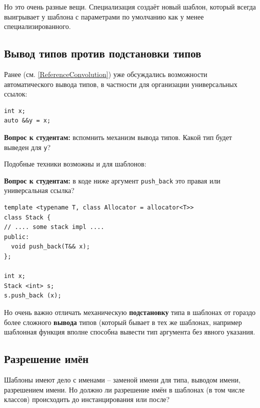 \documentclass[a4paper,12pt,oneside]{book}
\newif\ifanswers
\begin{document}
Но это очень разные вещи. Специализация создаёт новый шаблон, который всегда выигрывает у шаблона с параметрами по умолчанию как у менее специализированного.

\subsection{Вывод типов против подстановки типов}

Ранее (см. \ref{ReferenceConvolution}) уже обсуждались возможности автоматического вывода типов, в частности для организации универсальных ссылок:

\begin{lstlisting}
int x;
auto &&y = x;
\end{lstlisting}

\textbf{Вопрос к студентам:} вспомнить механизм вывода типов. Какой тип будет выведен для \lstinline!y!?

\ifanswers
Правильный ответ -- \lstinline!int&! так как для \lstinline!x! будет выведен тип \lstinline!int&!, а потом сработает свертывание ссылок.
\fi

Подобные техники возможны и для шаблонов:

\textbf{Вопрос к студентам:} в коде ниже аргумент \lstinline!push_back! это правая или универсальная ссылка?

\begin{lstlisting}
template <typename T, class Allocator = allocator<T>>
class Stack {
// .... some stack impl .... 
public:
  void push_back(T&& x);
};

int x;
Stack <int> s;
s.push_back (x);
\end{lstlisting}

\ifanswers
Правильный ответ -- правая, так как вывод \lstinline!T! для вектора подставляется, а не выводится. Таким образом будет ошибка компиляции.
\fi

Но очень важно отличать механическую \textbf{подстановку} типа в шаблонах от гораздо более сложного \textbf{вывода} типов (который бывает в тех же шаблонах, например шаблонная функция вполне способна вывести тип аргумента без явного указания.

\subsection{Разрешение имён}

Шаблоны имеют дело с именами -- заменой имени для типа, выводом имени, разрешением имени. Но должно ли разрешение имён в шаблонах (в том числе классов) происходить до инстанцирования или после?
\end{document}
